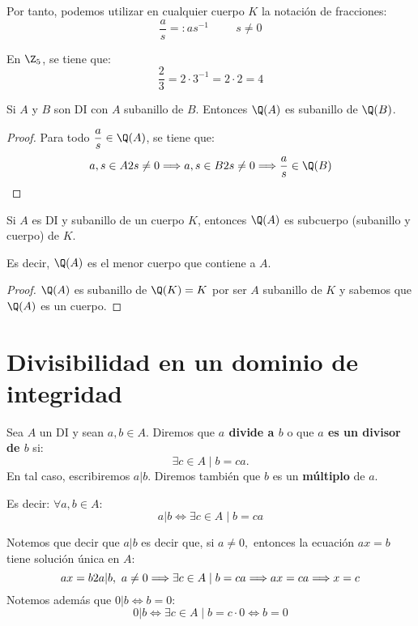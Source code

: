 Por tanto, podemos utilizar en cualquier cuerpo $K$ la notación de fracciones:
$$\dfrac{a}{s} =: as^{-1}\hspace{1cm}s \neq 0$$
\begin{ejemplo}
    En $\Z_5$, se tiene que:
    \begin{equation*}
        \frac{2}{3} = 2\cdot 3^{-1} = 2\cdot 2 = 4
    \end{equation*}
\end{ejemplo}

\begin{lema}
    Si $A$ y $B$ son DI con $A$ subanillo de $B$. Entonces $\Q(A)$ es subanillo de $\Q(B)$.
\end{lema}
\begin{proof} Para todo $\dfrac{a}{s} \in \Q(A)$, se tiene que:
    $$a,s \in A \y s \neq 0 \Longrightarrow a,s \in B \y s \neq 0 \Longrightarrow \dfrac{a}{s}
        \in \Q(B)$$
\end{proof}

\begin{lema}
    Si $A$ es DI y subanillo de un cuerpo $K$, entonces $\Q(A)$ es subcuerpo (subanillo y cuerpo) de $K$.

    Es decir, $\Q(A)$ es el menor cuerpo que contiene a $A$.
\end{lema}
\begin{proof}
    $\Q(A)$ es subanillo de $\Q(K) = K$ por ser $A$ subanillo de $K$ y sabemos que $\Q(A)$ es un cuerpo.
\end{proof}

\section{Divisibilidad en un dominio de integridad}
\begin{definicion}[Divisor]
    Sea $A$ un DI y sean $a,b \in A$. Diremos que \textbf{$a$ divide a $b$} o que \textbf{$a$ es un divisor de $b$} si:
    $$\exists c \in A \mid b = ca.$$
    En tal caso, escribiremos $a|b$. Diremos también que $b$ es un \textbf{múltiplo} de $a$.

    Es decir: $\forall a,b \in A$:
    $$a|b \Longleftrightarrow \exists c \in A \mid b = ca$$
\end{definicion}

Notemos que decir que $a|b$ es decir que, si $a \neq 0,$ entonces la ecuación $ax=b$ tiene solución única en $A$:
$$ax = b 2 a|b,~a\neq 0 \Longrightarrow \exists c \in A \mid b = ca \Longrightarrow ax=ca \Longrightarrow x=c$$
Notemos además que $0|b \Longleftrightarrow b=0$:
$$0|b \Longleftrightarrow \exists c \in A \mid b = c \cdot 0 \Longleftrightarrow b=0$$


